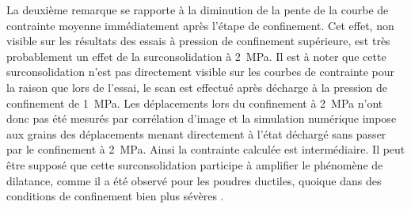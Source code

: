 	La deuxième remarque se rapporte à la diminution de la pente de la courbe de contrainte moyenne immédiatement après l'étape de confinement. Cet effet, non visible sur les résultats des essais à pression de confinement supérieure, est très probablement un effet de la surconsolidation à \SI{2}{\mega\pascal}. Il est à noter que cette surconsolidation n'est pas directement visible sur les courbes de contrainte pour la raison que lors de l'essai, le scan est effectué après décharge à la pression de confinement de \SI{1}{\mega\pascal}. Les déplacements lors du confinement à \SI{2}{\mega\pascal} n'ont donc pas été mesurés par corrélation d'image et la simulation numérique impose aux grains des déplacements menant directement à l'état déchargé sans passer par le confinement à \SI{2}{\mega\pascal}. Ainsi la contrainte calculée est intermédiaire. Il peut être supposé que cette surconsolidation participe à amplifier le phénomène de dilatance, comme il a été observé pour les poudres ductiles, quoique dans des conditions de confinement bien plus sévères \citep{pavier_caracterisation_1998}.
	
